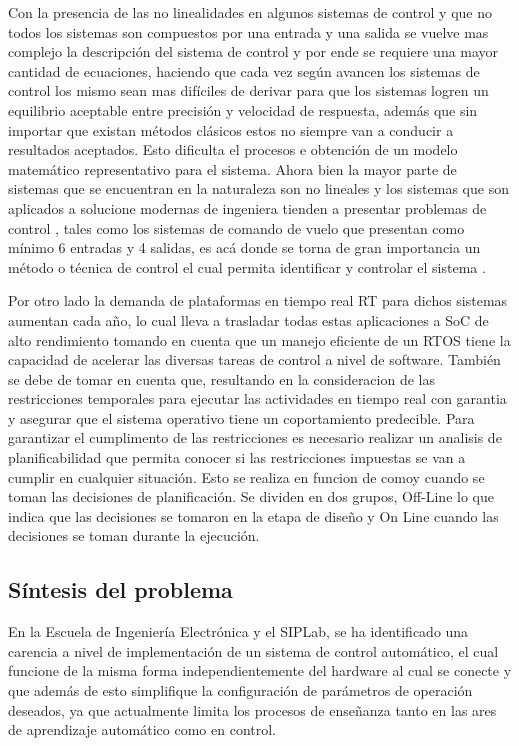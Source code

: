 \documentclass[12pt]{article}
\begin{document}
Con la presencia de las no linealidades en algunos sistemas de control y que no todos los sistemas son compuestos por una entrada y una salida se vuelve mas complejo la descripción del sistema  de control y por ende se requiere una mayor cantidad de ecuaciones, haciendo que cada vez según avancen los sistemas de control los mismo sean mas difíciles de derivar para que los sistemas logren un equilibrio aceptable entre precisión y velocidad de respuesta, además que sin importar que existan métodos clásicos estos no siempre van a conducir a resultados aceptados. Esto dificulta el procesos e obtención de un modelo matemático representativo para el sistema. Ahora bien la mayor parte de sistemas que se encuentran en la naturaleza son no lineales y los sistemas que son aplicados a solucione modernas de ingeniera tienden a presentar problemas de control , tales como los sistemas de comando de vuelo que presentan como mínimo 6 entradas y 4 salidas, es acá donde se torna de gran importancia un método o técnica de control el cual permita identificar y controlar el sistema \cite{15-tec}. 


Por otro lado la demanda de plataformas en tiempo real RT para dichos sistemas aumentan cada año, lo cual lleva a trasladar todas estas aplicaciones a SoC de alto rendimiento tomando en cuenta que un manejo eficiente de un RTOS tiene la capacidad de acelerar las diversas tareas de control a nivel de software. También se debe de tomar en cuenta que, resultando en la consideracion de las restricciones temporales para ejecutar las actividades en tiempo real con garantia y asegurar que el sistema operativo tiene un coportamiento predecible. Para garantizar el cumplimento de las restricciones es necesario realizar un analisis de planificabilidad que permita conocer si las restricciones impuestas se van a cumplir en cualquier situación. Esto se realiza en funcion de comoy cuando se toman las decisiones de planificación. Se dividen en dos grupos, Off-Line lo que indica que las decisiones se tomaron en la etapa de diseño y On Line cuando las decisiones se toman durante la ejecución.



\subsection{Síntesis del problema}

En la Escuela de Ingeniería Electrónica y el SIPLab, se ha identificado una carencia a nivel de implementación de un sistema de control automático, el cual funcione de la misma forma independientemente del  hardware al cual se conecte y que además de esto simplifique la configuración de parámetros de operación deseados, ya que actualmente limita los procesos de enseñanza tanto en las ares de aprendizaje automático como en control.
\end{document}
